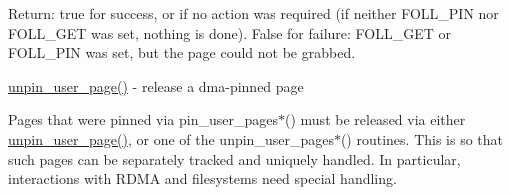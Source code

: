 Return\+: true for success, or if no action was required (if neither F\+O\+L\+L\+\_\+\+P\+IN nor F\+O\+L\+L\+\_\+\+G\+ET was set, nothing is done). False for failure\+: F\+O\+L\+L\+\_\+\+G\+ET or F\+O\+L\+L\+\_\+\+P\+IN was set, but the page could not be grabbed.

\mbox{\hyperlink{gup_8c_a660b424e7f87f459ffb8828df2a1bc75}{unpin\+\_\+user\+\_\+page()}} -\/ release a dma-\/pinned page

Pages that were pinned via pin\+\_\+user\+\_\+pages$\ast$() must be released via either \mbox{\hyperlink{gup_8c_a660b424e7f87f459ffb8828df2a1bc75}{unpin\+\_\+user\+\_\+page()}}, or one of the unpin\+\_\+user\+\_\+pages$\ast$() routines. This is so that such pages can be separately tracked and uniquely handled. In particular, interactions with R\+D\+MA and filesystems need special handling. 